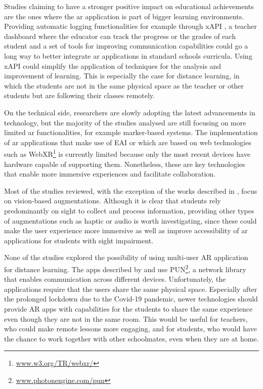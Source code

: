Studies claiming to have a stronger positive impact on educational achievements are the ones where the \gls{ar} application is part of bigger learning environments. Providing automatic logging functionalities \textendash{} for example through xAPI \citep{kevan2016experience} \textendash{}, a teacher dashboard where the educator can track the progress or the grades of each student and a set of tools for improving communication capabilities could go a long way to better integrate \gls{ar} applications in standard schools curricula. Using xAPI could simplify the application of techniques for the analysis and improvement of learning. This is especially the case for distance learning, in which the students are not in the same physical space as the teacher or other students but are following their classes remotely.

On the technical side, researchers are slowly adopting the latest advancements in technology, but the majority of the studies analysed are still focusing on more limited \gls{ar} functionalities, for example marker-based systems. The implementation of \gls{ar} applications that make use of \gls{EAI} or which are based on web technologies such as WebXR\footnote{\url{www.w3.org/TR/webxr/}} is currently limited because only the most recent devices have hardware capable of supporting them. Nonetheless, these are key technologies that enable more immersive experiences and facilitate collaboration. 

Most of the studies reviewed, with the exception of the works described in \cite{chen2018application, kenoui2020teach, mikulowski2020multi}, focus on vision-based augmentations. Although it is clear that students rely predominantly on sight to collect and process information, providing other types of augmentations such as haptic or audio is worth investigating, since these could make the user experience more immersive as well as improve accessibility of \gls{ar} applications for students with sight impairment.

None of the studies explored the possibility of using multi-user AR application for distance learning. The apps described by \cite{oh2017hybrid} and \cite{lopez2020emofindar} use PUN\footnote{\url{www.photonengine.com/pun}}, a network library that enables communication across different devices. Unfortunately, the applications require that the users share the same physical space. Especially after the prolonged lockdown due to the Covid-19 pandemic, newer technologies should provide AR apps with capabilities for the students to share the same experience even though they are not in the same room. This would be useful for teachers, who could make remote lessons more engaging, and for students, who would have the chance to work together with other schoolmates, even when they are at home.  

